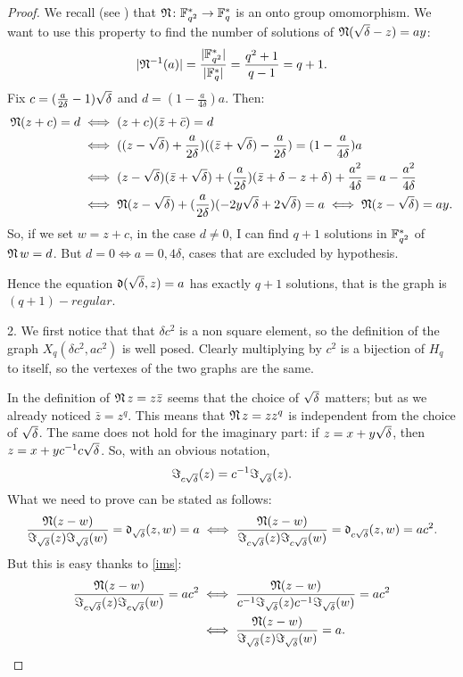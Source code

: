 \begin{theorem}
\begin{proof}
We recall (see \cite{lidl1994introduction}) that $\mathfrak{N}\colon {\mathbb F}_{q^2}^{*} \to {\mathbb F}_q^{*}$ is an onto group omomorphism.
We want to use this property to find the number of solutions of $\operatorname{\mathfrak{N}} (\sqrt{\delta} - z) = ay$:
\begin{equation}
	\lvert \mathfrak{N}^{-1}(a)\rvert=\frac{\lvert{\mathbb F}_{q^2}^{*}\rvert}{\lvert{\mathbb F}_q^{*}\rvert}=\frac{q^2+1}{q-1}=q+1.
\end{equation}
Fix $c=(\frac{a}{2\delta}-1)\sqrt{\delta}$ and $d=(1-\frac{a}{4\delta})a$. Then:
\begin{align*}
	\operatorname{\mathfrak{N}} (z+c) = d &\iff (z+c)(\bar{z}+\bar{c})=d \\
					&\iff ((z-\sqrt{\delta})+\frac{a}{2\delta})((\bar{z}+\sqrt{\delta})-\frac{a}{2\delta})=(1-\frac{a}{4\delta})a \\
					&\iff (z-\sqrt{\delta})(\bar{z}+\sqrt{\delta})+(\frac{a}{2\delta})(\bar{z}+\delta-z+\delta)+\frac{a^2}{4\delta}=a-\frac{a^2}{4\delta} \\
					&\iff \operatorname{\mathfrak{N}} (z-\sqrt{\delta})+(\frac{a}{2\delta})(-2y\sqrt{\delta} +2\sqrt{\delta})=a \iff \operatorname{\mathfrak{N}} (z - \sqrt{\delta}) = ay.
\end{align*}
So, if we set $w=z+c$, in the case $d\neq 0$, I can find $q+1$ solutions in ${\mathbb F}_{q^2}^{*}$ of $\operatorname{\mathfrak{N}} w = d$.
But $d=0 \iff a=0,4\delta$, cases that are excluded by hypothesis.

Hence the equation $\operatorname{\mathfrak{d}} (\sqrt{\delta}, z)=a$ has exactly $q+1$ solutions, that is the graph is $(q+1)-regular$.

2. We first notice that that $\delta c^2$ is a non square element, so the definition of the graph $X_q(\delta c^2, a c^2)$
is well posed. Clearly multiplying by $c^2$ is a bijection of $H_q$ to itself, so the vertexes of the two graphs are the same.

In the definition of $\operatorname{\mathfrak{N}} z = z \bar{z}$ seems that the choice of $\sqrt{\delta}$ matters; but as we already noticed $\bar{z}=z^q$.
This means that $\operatorname{\mathfrak{N}} z = z z^q$ is independent from the choice of $\sqrt{\delta}$. The same does not hold for the imaginary part:
if $z=x+y\sqrt{\delta}$, then $z=x+yc^{-1} c \sqrt{\delta} $. So, with an obvious notation, 
\begin{equation} \label{ims}
	\Im_{c\sqrt{\delta}} (z) = c^{-1} \Im_{\sqrt{\delta}} (z).
\end{equation}
What we need to prove can be stated as follows:
\begin{equation*}
	\frac{\operatorname{\mathfrak{N}} (z-w)}{\Im_{\sqrt{\delta}} (z) \Im_{\sqrt{\delta}} (w)}=\operatorname{\mathfrak{d}}_{\sqrt{\delta}} (z,w)=a \iff 
	\frac{\operatorname{\mathfrak{N}} (z-w)}{\Im_{c\sqrt{\delta}} (z) \Im_{c\sqrt{\delta}} (w)}=\operatorname{\mathfrak{d}}_{c\sqrt{\delta}} (z,w)=ac^2.
\end{equation*}
But this is easy thanks to \ref{ims}:
\begin{align*}
	\frac{\operatorname{\mathfrak{N}} (z-w)}{\Im_{c\sqrt{\delta}} (z) \Im_{c\sqrt{\delta}} (w)}=ac^2 &\iff \frac{\operatorname{\mathfrak{N}} (z-w)}{c^{-1}\Im_{\sqrt{\delta}} (z)c^{-1} \Im_{\sqrt{\delta}} (w)}=ac^2 \\
															&\iff \frac{\operatorname{\mathfrak{N}} (z-w)}{\Im_{\sqrt{\delta}} (z) \Im_{\sqrt{\delta}} (w)}=a.
\end{align*}


\end{proof}
\end{theorem}
